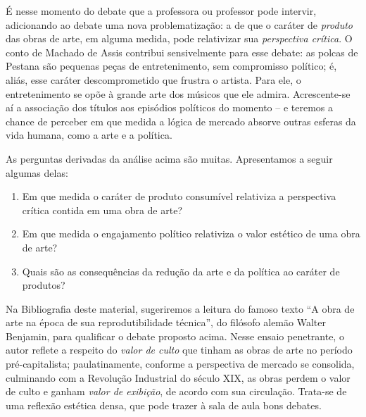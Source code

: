 \documentclass[12pt]{extarticle}
\begin{document}
É nesse momento do debate que a professora ou professor pode intervir,
adicionando ao debate uma nova problematização: a de que o caráter de
\emph{produto} das obras de arte, em alguma medida, pode relativizar sua
\emph{perspectiva crítica}. O conto de Machado de Assis contribui
sensivelmente para esse debate: as polcas de Pestana são pequenas peças
de entretenimento, sem compromisso político; é, aliás, esse caráter
descomprometido que frustra o artista. Para ele, o entretenimento se
opõe à grande arte dos músicos que ele admira. Acrescente-se aí a
associação dos títulos aos episódios políticos do momento -- e teremos a
chance de perceber em que medida a lógica de mercado absorve outras
esferas da vida humana, como a arte e a política.

As perguntas derivadas da análise acima são muitas. Apresentamos a
seguir algumas delas:

\begin{enumerate}
\item Em que medida o caráter de produto consumível relativiza a
perspectiva crítica contida em uma obra de arte?

\item Em que medida o engajamento político relativiza o valor estético de
uma obra de arte?

\item Quais são as consequências da redução da arte e da política ao
caráter de produtos?
\end{enumerate}

Na Bibliografia deste material, sugeriremos a leitura do famoso texto
``A obra de arte na época de sua reprodutibilidade técnica'', do
filósofo alemão Walter Benjamin, para qualificar o debate proposto
acima. Nesse ensaio penetrante, o autor reflete a respeito do
\emph{valor de culto} que tinham as obras de arte no período
pré-capitalista; paulatinamente, conforme a perspectiva de mercado se
consolida, culminando com a Revolução Industrial do século XIX, as obras
perdem o valor de culto e ganham \emph{valor de exibição}, de acordo com
sua circulação. Trata-se de uma reflexão estética densa, que pode trazer
à sala de aula bons debates.
\end{document}
